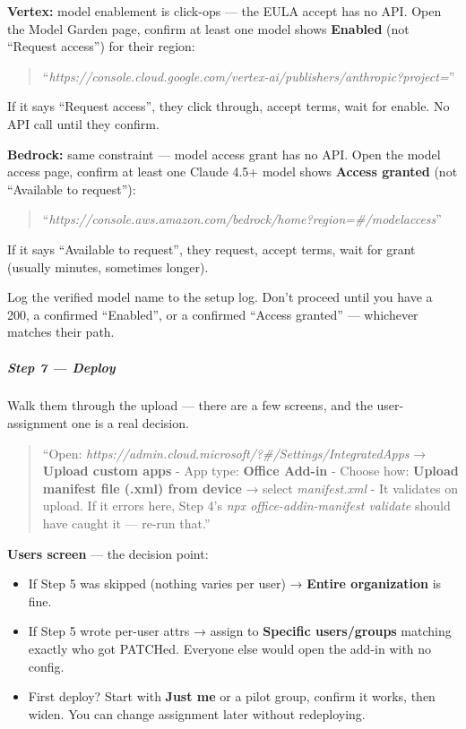 \documentclass[11pt]{article}
\begin{document}
\textbf{Vertex:} model enablement is click-ops — the EULA accept has no API. Open the Model Garden page, confirm at least one model shows \textbf{Enabled} (not ``Request access'') for their region:


\begin{quote}
``\emph{https://console.cloud.google.com/vertex-ai/publishers/anthropic?project=}''
\end{quote}

If it says ``Request access'', they click through, accept terms, wait for enable. No API call until they confirm.


\textbf{Bedrock:} same constraint — model access grant has no API. Open the model access page, confirm at least one Claude 4.5+ model shows \textbf{Access granted} (not ``Available to request''):


\begin{quote}
``\emph{https://console.aws.amazon.com/bedrock/home?region=\#/modelaccess}''
\end{quote}

If it says ``Available to request'', they request, accept terms, wait for grant (usually minutes, sometimes longer).


Log the verified model name to the setup log. Don't proceed until you have a 200, a confirmed ``Enabled'', or a confirmed ``Access granted'' — whichever matches their path.


\subparagraph{Step 7 — Deploy}\mbox{}\par

Walk them through the upload — there are a few screens, and the user-assignment one is a real decision.


\begin{quote}
``Open: \emph{https://admin.cloud.microsoft/?\#/Settings/IntegratedApps} → \textbf{Upload custom apps} - App type: \textbf{Office Add-in} - Choose how: \textbf{Upload manifest file (.xml) from device} → select \emph{manifest.xml} - It validates on upload. If it errors here, Step 4's \emph{npx office-addin-manifest validate} should have caught it — re-run that.''
\end{quote}

\textbf{Users screen} — the decision point:

\begin{itemize}[leftmargin=*,itemsep=2pt,topsep=2pt]
\item {} If Step 5 was skipped (nothing varies per user) → \textbf{Entire organization} is fine.
\item {} If Step 5 wrote per-user attrs → assign to \textbf{Specific users/groups} matching exactly who got PATCHed. Everyone else would open the add-in with no config.
\item {} First deploy? Start with \textbf{Just me} or a pilot group, confirm it works, then widen. You can change assignment later without redeploying.
\end{itemize}
\end{document}
